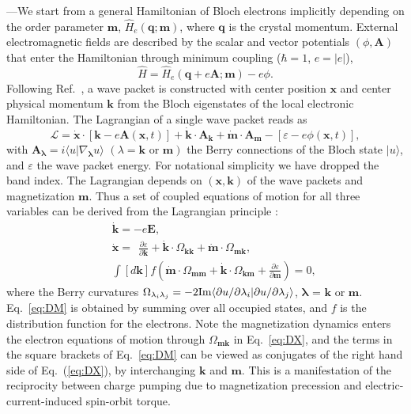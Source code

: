 \documentclass[aps,prb,twocolumn,showpacs,superscriptaddress]{revtex4-1}
\def\be{\begin{equation}} \def\ee{\end{equation}}
\def\bea{\begin{eqnarray}} \def\eea{\end{eqnarray}}
\def\fracp#1#2{\frac{\partial #1}{\partial #2}}
\newcommand{\ket}[1]{| #1 \rangle}
\newcommand{\bra}[1]{\langle #1 |}
\newcommand{\Lagr}{\mathcal{L}}
\begin{document}
---We start from a general Hamiltonian of Bloch electrons implicitly depending on the order parameter $\bm m$, $\hat H_e(\bm{q};\bm{m})$, where $\bm{q}$ is the crystal momentum. External electromagnetic fields are described by the scalar and vector potentials $(\phi,\bm{A} )$ that enter the Hamiltonian through minimum coupling ($\hbar = 1$, $e = |e|$), 
 \be
  \hat H=\hat H_e(\bm{q} + e\bm{A};\bm{m})-e  \phi.
 \ee  
Following Ref.~, a wave packet is constructed with center position $\bm{x}$ and center physical momentum $\bm{k}$ from the Bloch eigenstates of the local electronic Hamiltonian. The Lagrangian of a single wave packet reads as
\be
\Lagr= \dot{\bm{x}} \cdot  [\bm{k}-e \bm{A}(\bm{x},t)] + \dot{\bm{k}} \cdot \bm A_{\bm{k}} + \dot {\bm{m}} \cdot  \bm A_{\bm{m}} - [\varepsilon-e\phi(\bm{x},t)], \label{eq:lagr}
\ee
with $\bm A_{\bm \lambda} = i \bra {u} {\nabla_{\bm \lambda} u} \rangle$ $(\lambda= \bm{k} \text{ or } \bm{m})$ the Berry connections of the Bloch state $\ket {u}$, and $\varepsilon$ the wave packet energy. For notational simplicity we have dropped the band index. The Lagrangian depends on $(\bm{x},\bm{k})$ of the wave packets and magnetization $\bm{m}$. Thus a set of coupled equations of motion for all three variables can be derived from the Lagrangian principle \cite{niu:2010rmp}:
\bea
&&\dot{\bm{k}} = -e\bm{E}  , \label{eq:DK}  \\
&&\dot{\bm{x}} =\ \  \fracp{\varepsilon}{\bm{k} } + \dot{\bm{k}}\cdot \Omega_{\bm{k} \bm{k} }+\dot {\bm{m}} \cdot \Omega_{\bm{m}\bm{k} }, \label{eq:DX} \\
&&\int [d\bm{k}] f \left (\dot {\bm{m}} \cdot \Omega_{\bm{m}\bm{m}}+ \dot{\bm{k}} \cdot \Omega_{\bm{k}\bm{m}}+\fracp{\varepsilon}{\bm{m}}\right )=0,  \label{eq:DM}
\eea
where the Berry curvatures 
$
\Omega_{\lambda_i\lambda_j} = -2 {\rm Im} \langle {\partial u /\partial \lambda_i } | {\partial u/ \partial \lambda_j} \rangle
$, $\bm \lambda$ = $\bm{k}$ or $\bm{m}$. Eq.~\ref{eq:DM} is obtained by summing over all occupied states, and $f$ is the distribution function for the electrons. Note the magnetization dynamics enters the electron equations of motion through $\Omega_{\bm{m} \bm{k} }$ in Eq.~\ref{eq:DX}, and the terms in the square brackets of Eq.~\ref{eq:DM} can be viewed as conjugates of the right hand side of Eq.~(\ref{eq:DX}), by interchanging $\bm{k}$ and $ \bm{m}$. This is a manifestation of the reciprocity between charge pumping due to magnetization precession and electric-current-induced spin-orbit torque.
\end{document}
